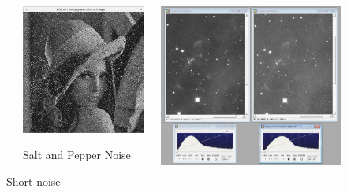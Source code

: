 \documentclass{beamer}
\begin{document}
\begin{frame}[plain]
\begin{figure}
\begin{columns}[onlytextwidth]
\begin{column}{0.3\textwidth}
                \label{fig:sub1}
            \end{column}
            \begin{column}{0.3\textwidth}
                \centering
                \includegraphics[width=.7\linewidth, scale=0.2]{img/salr_pepper.png}
               \caption{Salt and Pepper Noise}
                \label{fig:sub2}
            \end{column}
            \begin{column}{.3\textwidth}
                \centering
                \includegraphics[width=.7\linewidth, scale=0.2]{img/short_noise.png}
               \caption{Short noise}
                \label{fig:sub2}
            \end{column}
        \end{columns}
       
        \label{fig:images}
    \end{figure}   
\end{frame}
\end{document}
